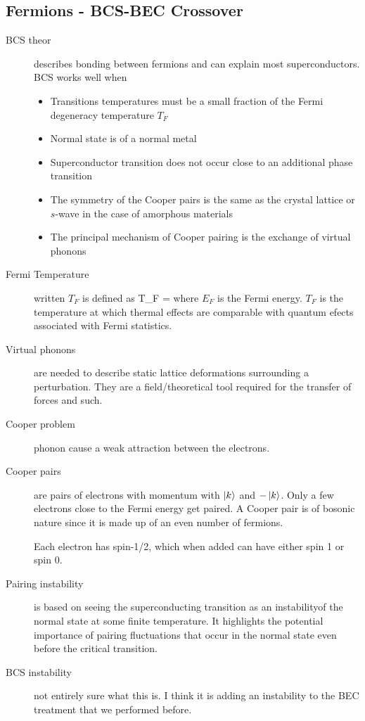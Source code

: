 \subsection{Fermions - BCS-BEC Crossover}
\begin{description}
\item[BCS theor] describes bonding between fermions and can explain most superconductors. BCS works well when
\begin{itemize}
\item Transitions temperatures must be a small fraction of the Fermi degeneracy temperature $T_F$
\item Normal state is of a normal metal 
\item Superconductor transition does not occur close to an additional phase transition 
\item The symmetry of the Cooper pairs is the same as the crystal lattice or $s$-wave in the case of amorphous materials
\item The principal mechanism of Cooper pairing is the exchange of virtual phonons
\end{itemize}

\item[Fermi Temperature] written $T_F$ is defined as
\beq
T_F = 
\eeq
where $E_F$  is the Fermi energy.  $T_F$ is the temperature at which thermal effects are comparable with quantum efects associated with Fermi statistics. 


\item[Virtual phonons] are needed to describe static lattice deformations surrounding a perturbation. They are a field/theoretical tool  required for the transfer of forces and such. 


\item[Cooper problem] phonon cause a weak attraction between the electrons. 

\item[Cooper pairs] are pairs of electrons with momentum with $\left| k \right\rangle$ and $-\left| k \right\rangle$. Only a few electrons close to the Fermi energy get paired. A Cooper pair is of bosonic nature since it is made up of an even number of fermions. 

Each electron has spin-1/2, which when added can have either spin 1 or spin 0. 

\item[Pairing instability] is based on seeing the superconducting transition as an instabilityof the normal state at some finite temperature. It highlights the potential importance of pairing fluctuations that occur in the normal state even before the critical transition. 

\item[BCS instability] not entirely sure what this is. I think it is adding an instability to the BEC treatment that we performed before. 

\end{description}
